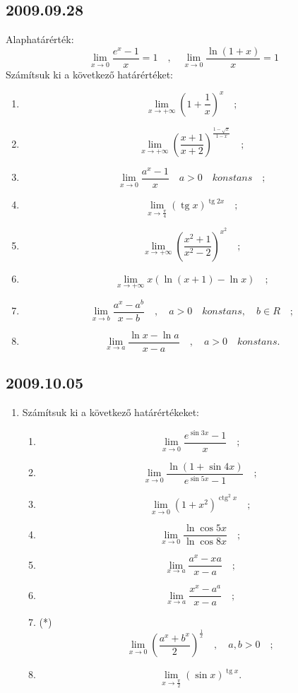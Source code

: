 \documentclass{article}
\newenvironment{abc}{\begin{enumerate}[label=\textit{\alph*})]}{\end{enumerate}}
\newcommand{\tg}{\mathop{\mathrm{tg}}\nolimits}
\newcommand{\ctg}{\mathop{\mathrm{ctg}}\nolimits}
\begin{document}
\subsection*{2009.09.28}
Alaphatárérték:
$$\lim_{x\to 0}\frac{e^x-1}{x}=1\quad,\quad\lim_{x\to 0}\frac{\ln(1+x)}{x}=1$$
Számítsuk ki a következő határértéket:
\begin{enumerate}
\item $$\lim_{x\to +\infty}\left(1+\frac{1}{x}\right)^x\quad;$$
\item $$\lim_{x\to +\infty}\left(\frac{x+1}{x+2}\right)^{\frac{1-\sqrt{x}}{1-x}}\quad;$$
\item $$\lim_{x\to 0}\frac{a^x-1}{x}\quad a>0\quad konstans\quad;$$
\item $$\lim_{x\to\frac{\pi}{4}}\left(\tg x\right)^{\tg 2x}\quad;$$
\item $$\lim_{x\to +\infty}\left(\frac{x^2+1}{x^2-2}\right)^{x^2}\quad;$$
\item $$\lim_{x\to +\infty}x\left(\ln(x+1)-\ln x\right)\quad;$$
\item $$\lim_{x\to b}{\frac{a^x-a^b}{x-b}}\quad,\quad a>0\quad konstans,\quad b\in{R}\quad;$$
\item $$\lim_{x\to a}{\frac{\ln x-\ln a}{x-a}}\quad,\quad a>0\quad konstans.$$
\end{enumerate}
\subsection*{2009.10.05}
\begin{enumerate}
\item Számítsuk ki a következő határértékeket:
\begin{abc}
\item $$\lim_{x\to 0}\frac{e^{\sin 3x}-1}{x}\quad;$$
\item $$\lim_{x\to 0}\frac{\ln(1+\sin 4x)}{e^{\sin 5x}-1}\quad;$$
\item $$\lim_{x\to 0}\left(1+x^2\right)^{\ctg ^2 x}\quad;$$
\item $$\lim_{x\to 0}{\frac{\ln \cos 5x}{\ln \cos 8x}}\quad;$$
\item $$\lim_{x\to a}{\frac{a^x-x{a}}{x-a}}\quad;$$
\item $$\lim_{x\to a}\frac{x^x-a^{a}}{x-a}\quad;$$
\item (*)$$\lim_{x\to 0}\left(\frac{a^x+b^x}{2}\right)^{\frac{1}{x}}\quad,\quad a,b>0\quad;$$
\item $$\lim_{x\to \frac{\pi}{2}}
(\sin x)^{\tg x}.$$
\end{abc}
\end{enumerate}
\end{document}
